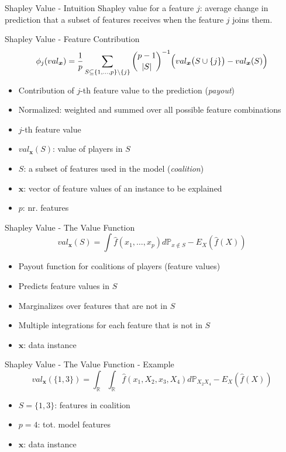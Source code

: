 \begin{frame}{Shapley Value - Intuition}
 Shapley value for a feature $j$: average change in prediction that a subset of features receives when the feature $j$ joins them.
\end{frame}
\begin{frame}{Shapley Value - Feature Contribution}
\begin{equation}
	\phi_j(val_{\bm{x}})=\frac{1}{p}\sum_{S\subseteq\{1,\ldots,p\} \backslash \{j\}}\binom{p-1}{|S|}^{-1}\Bigl(val_{\bm{x}}\bigl(S\cup\{j\}\bigr)-val_{\bm{x}}(S)\Bigr)
\end{equation}
\begin{itemize}
	\item Contribution of $j$-th feature value to the prediction (\emph{payout})
	\item Normalized: weighted and summed over all possible feature combinations
	\item $j$-th feature value
	\item $val_{\bm{x}}(S)$: value of players in $S$ %
	\item $S$: a subset of features used in the model (\emph{coalition})
	\item $\bm{x}$: vector of feature values of an instance to be explained
	\item $p$: nr. features
\end{itemize}
\end{frame}
\begin{frame}{Shapley Value - The Value Function}
\begin{equation}
	val_{\bm{x}}(S)=\int\hat{f}(x_{1},\ldots,x_{p})d\mathbb{P}_{x\notin{}S}-E_X(\hat{f}(X))
\end{equation}
\begin{itemize}
	\item Payout function for coalitions of players (feature values)
	\item Predicts feature values in $S$
	\item Marginalizes over features that are not in $S$
	\item Multiple integrations for each feature that is not in $S$
	\item $\bm{x}$: data instance
\end{itemize}
\end{frame}

\begin{frame}{Shapley Value - The Value Function - Example}
\begin{equation}
val_{\bm{x}}(\{1,3\})=\int_{\mathbb{R}}\int_{\mathbb{R}}\hat{f}(x_{1},X_{2},x_{3},X_{4})d\mathbb{P}_{X_2X_4}-E_X(\hat{f}(X))
\end{equation}
\begin{itemize}
	\item $S = \{1,3\}$: features in coalition
	\item $p = 4$: tot. model features
	\item $\bm{x}$: data instance
\end{itemize}
\end{frame}

